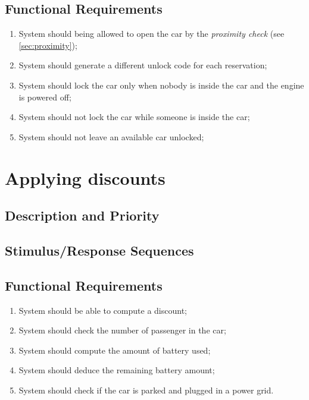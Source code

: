 \documentclass{scrreprt}
\begin{document}
\subsection{Functional Requirements}
\begin{enumerate}[label=R\arabic*.,resume]
\item System should being allowed to open the car by the \emph{proximity check} (see \vref{sec:proximity});
\item System should generate a different unlock code for each reservation;
\item System should lock the car only when nobody is inside the car and the engine is powered off;
\item System should not lock the car while someone is inside the car;
\item System should not leave an available car unlocked;
\end{enumerate}

\section{Applying discounts}
\subsection{Description and Priority}

\subsection{Stimulus/Response Sequences}

\subsection{Functional Requirements}
\begin{enumerate}[label=R\arabic*.,resume]
\item System should be able to compute a discount;
\item System should check the number of passenger in the car;
\item System should compute the amount of battery used;
\item System should deduce the remaining battery amount;
\item System should check if the car is parked and plugged in a power grid.
\end{enumerate}
\end{document}
